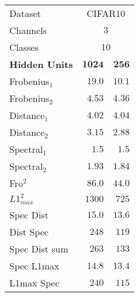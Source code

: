 \documentclass[11pt, reqno]{amsart}
\begin{document}
\begin{problem}[1]
\begin{table}[h]
\begin{minipage}{.6\textwidth}
\begin{tabular}{| l | r | r |}
          Dataset                   & \multicolumn{2}{c|}{CIFAR10}                                    \\
          Channels                  & \multicolumn{2}{c|}{$3$}                                        \\
          Classes                   & \multicolumn{2}{c|}{$10$}                                       \\
          \midrule
          \textbf{Hidden Units}     & $\mathbf{1024}$                     & $\mathbf{256}$                      \\
          \midrule
          Frobenius$_1$             & $19.0$                              & $10.1$                              \\
          Frobenius$_2$             & $4.53$                              & $4.36$                              \\
          Distance$_1$              & $4.02$                              & $4.04$                              \\
          Distance$_2$              & $3.15$                              & $2.88$                              \\
          Spectral$_1$              & $1.5$                               & $1.5$                               \\
          Spectral$_2$              & $1.93$                              & $1.84$                              \\
          Fro$^2$                   & $86.0$                              & $44.0$                              \\
          $L1_{max}^2$ 	            & $1300$                              & $725$                               \\
          Spec Dist 	              & $15.0$                              & $13.6$                              \\
          Dist Spec 	              & $248$                               & $119$                               \\
          Spec Dist sum 	          & $263$                               & $133$                               \\
          Spec L1max 	              & $14.8$                              & $13.4$                              \\
          L1max Spec 	              & $240$                               & $115$                               \\

\end{tabular}
\end{minipage}
\end{table}
\end{problem}
\end{document}
